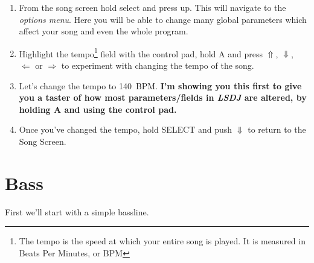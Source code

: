 \documentclass[]{article}
\newcommand{\buttonStyle}[1]{\textsf{#1}\xspace}
\newcommand{\buttonSymbolStyle}[1]{$\bm{#1}$\xspace}
\newcommand{\bA}{\buttonStyle{A}}
\newcommand{\bSelect}{\buttonStyle{{SELECT}}}
\newcommand{\bRight}{\buttonSymbolStyle{\Rightarrow}}
\newcommand{\bLeft}{\buttonSymbolStyle{\Leftarrow}}
\newcommand{\bUp}{\buttonSymbolStyle{\Uparrow}}
\newcommand{\bDown}{\buttonSymbolStyle{\Downarrow}}
\newcommand{\lsdj}{\textit{LSDJ}\xspace}
\begin{document}

\begin{enumerate}



\item From the song screen hold select and press up. This will navigate to the \textit{options menu}. Here you will be able to change many global parameters which affect your song and even the whole program.

\item Highlight the tempo\footnote{The tempo is the speed at which your entire song is played. It is measured in Beats Per Minutes, or BPM} field with the control pad, hold \bA and press \bUp, \bDown, \bLeft or \bRight to experiment with changing the tempo of the song.

\item Let's change the tempo to 140~BPM. \textbf{I'm showing you this first to give you a taster of how most parameters/fields in \lsdj are altered, by holding \bA and using the control pad.}

\item Once you've changed the tempo, hold \bSelect and push \bDown to return to the Song Screen.
\end{enumerate}

\section{Bass}

First we'll start with a simple bassline.
\end{document}
